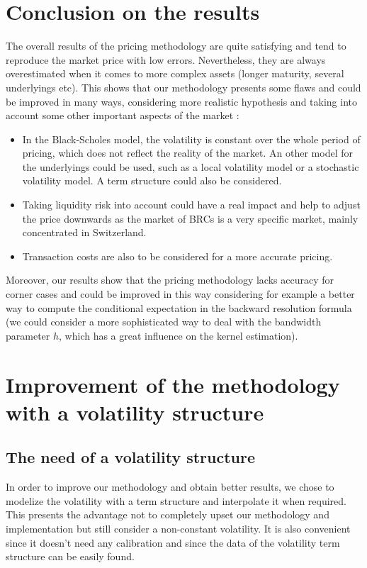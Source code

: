 \documentclass[a4paper,11pt,english]{book}
\begin{document}
\section{Conclusion on the results}
The overall results of the pricing methodology are quite satisfying and tend to reproduce the market price with low errors. Nevertheless, they are always overestimated when it comes to more complex assets (longer maturity, several underlyings etc). This shows that our methodology presents some flaws and could be improved in many ways, considering more realistic hypothesis and taking into account some other important aspects of the market :
\begin{itemize}
    \item In the Black-Scholes model, the volatility is constant over the whole period of pricing, which does not reflect the reality of the market. An other model for the underlyings could be used, such as a local volatility model or a stochastic volatility model. A term structure could also be considered.
    \item Taking liquidity risk into account could have a real impact and help to adjust the price downwards as the market of BRCs is a very specific market, mainly concentrated in Switzerland.
    \item Transaction costs are also to be considered for a more accurate pricing.
\end{itemize}

Moreover, our results show that the pricing methodology lacks accuracy for corner cases and could be improved in this way considering for example a better way to compute the conditional expectation in the backward resolution formula (we could consider a more sophisticated way to deal with the bandwidth parameter $h$, which has a great influence on the kernel estimation).

\section{Improvement of the methodology with a volatility structure}
\subsection{The need of a volatility structure}
In order to improve our methodology and obtain better results, we chose to modelize the volatility with a term structure and interpolate it when required. This presents the advantage not to completely upset our methodology and implementation but still consider a non-constant volatility. It is also convenient since it doesn't need any calibration and since the data of the volatility term structure can be easily found.
\end{document}
